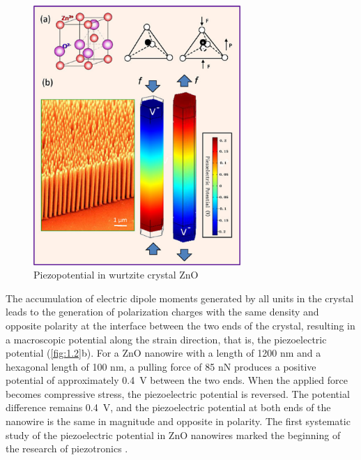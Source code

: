 \begin{figure}[H] 
\centering    
\includegraphics[width=0.7\textwidth]{ch1_2}
\caption[Piezopotential in wurtzite crystal ZnO]{Piezopotential in wurtzite crystal ZnO \protect\cite{wang2012piezotronics}}
\label{fig:1.2}
\end{figure}

The accumulation of electric dipole moments  generated by all units in the crystal  leads to the generation of polarization charges  with the same density and opposite polarity at the interface  between the two ends of the crystal, resulting in a macroscopic potential along the strain  direction, that is, the  piezoelectric potential (\autoref{fig:1.2}b). For a ZnO nanowire with a length of 1200 \unit{\nm} and a hexagonal length of 100 \unit{\nm}, a pulling force of 85 \unit{\nano\newton} produces a positive potential of approximately \SI{0.4}{\volt} between the two ends. When the applied force becomes compressive stress, the piezoelectric potential is reversed. The potential difference remains \SI{0.4}{\volt}, and the piezoelectric potential at both ends of the nanowire is the same in magnitude and opposite in polarity. The first systematic study of the  piezoelectric potential in ZnO nanowires marked the beginning of the research of  piezotronics \cite{wang2006piezoelectric}.

